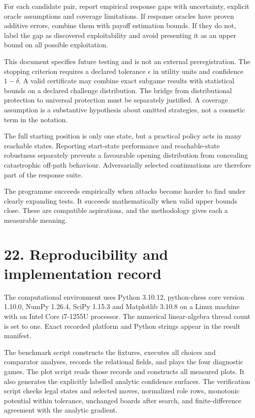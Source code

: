 \documentclass[10pt]{article}
\begin{document}
For each candidate pair, report empirical response gaps with uncertainty, explicit oracle assumptions and coverage limitations. If response oracles have proven additive errors, combine them with payoff estimation bounds. If they do not, label the gap as discovered exploitability and avoid presenting it as an upper bound on all possible exploitation.

This document specifies future testing and is not an external preregistration. The stopping criterion requires a declared tolerance $\epsilon$ in utility units and confidence $1-\delta$. A valid certificate may combine exact subgame results with statistical bounds on a declared challenge distribution. The bridge from distributional protection to universal protection must be separately justified. A coverage assumption is a substantive hypothesis about omitted strategies, not a cosmetic term in the notation.

The full starting position is only one state, but a practical policy acts in many reachable states. Reporting start-state performance and reachable-state robustness separately prevents a favourable opening distribution from concealing catastrophic off-path behaviour. Adversarially selected continuations are therefore part of the response suite.

The programme succeeds empirically when attacks become harder to find under clearly expanding tests. It succeeds mathematically when valid upper bounds close. These are compatible aspirations, and the methodology gives each a measurable meaning.

\clearpage
\section*{22. Reproducibility and implementation record}
The computational environment uses Python 3.10.12, python-chess core version 1.10.0, NumPy 1.26.4, SciPy 1.15.3 and Matplotlib 3.10.8 on a Linux machine with an Intel Core i7-1255U processor. The numerical linear-algebra thread count is set to one. Exact recorded platform and Python strings appear in the result manifest.

The benchmark script constructs the fixtures, executes all choices and comparator analyses, records the relational fields, and plays the four diagnostic games. The plot script reads those records and constructs all measured plots. It also generates the explicitly labelled analytic confidence surfaces. The verification script checks legal states and selected moves, normalized role rows, monotonic potential within tolerance, unchanged boards after search, and finite-difference agreement with the analytic gradient.
\end{document}
